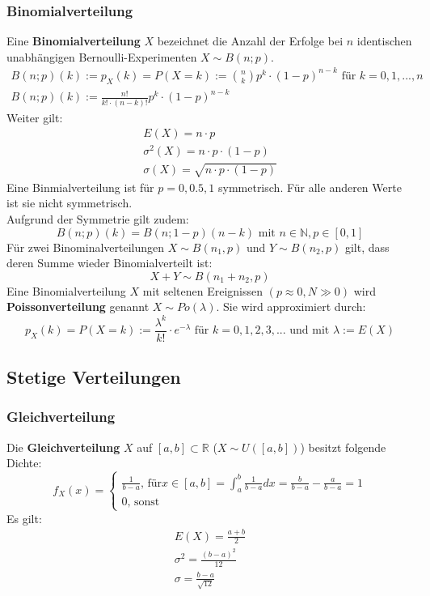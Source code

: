 \documentclass[12pt]{article}
\begin{document}
\subsubsection{Binomialverteilung}
Eine \textbf{Binomialverteilung} $X$ bezeichnet die Anzahl der Erfolge bei $n$ identischen unabhängigen Bernoulli-Experimenten $X \sim B(n;p)$.  
\begin{gather*}
	B(n;p)(k) := p_X(k) = P(X=k):= {n \choose k}p^k\cdot (1-p)^{n-k} \text{ für } k=0,1,...,n \\
	 B(n;p)(k) := \frac{n!}{k!\cdot(n-k)!}p^k\cdot (1-p)^{n-k}
\end{gather*}
Weiter gilt:
\begin{gather*}
	E(X)=n\cdot p\\
	\sigma^2(X)=n\cdot p \cdot (1-p)\\
	\sigma(X)=\sqrt{n\cdot p\cdot (1-p)}
\end{gather*}
Eine Binmialverteilung ist für $p=0,0.5,1$ symmetrisch. Für alle anderen Werte ist sie nicht symmetrisch.\\
Aufgrund der Symmetrie gilt zudem:
\begin{equation*}
	B(n;p)(k) = B(n;1-p)(n-k) \text{ mit } n\in \mathbb{N}, p\in [0,1]
\end{equation*}
Für zwei Binominalverteilungen $X\sim B(n_1,p)$ und $Y\sim B(n_2,p)$ gilt, dass deren Summe wieder Binomialverteilt ist:
\begin{equation*}
	X+Y\sim B(n_1+n_2,p)
\end{equation*}
Eine Binomialverteilung $X$ mit seltenen Ereignissen $(p\approx0, N\gg 0)$ wird \textbf{Poissonverteilung} genannt $X\sim Po(\lambda)$. Sie wird approximiert durch:
\begin{equation*}
	p_X(k)=P(X=k):=\frac{\lambda^k}{k!}\cdot e^{-\lambda} \text{ für } k=0,1,2,3,... \text{ und mit } \lambda:=E(X)
\end{equation*}
\subsection{Stetige Verteilungen}
\subsubsection{Gleichverteilung}
Die \textbf{Gleichverteilung} $X$ auf $[a,b]\subset \mathbb{R}$ ($X\sim U([a,b])$) besitzt folgende Dichte:
\begin{equation*}
	f_X(x)=\begin{cases}
		\frac{1}{b-a} \text{, für} x\in [a,b] = \int_a^b\frac{1}{b-a}dx=\frac{b}{b-a}-\frac{a}{b-a}=1\\
		0\text{, sonst}
	\end{cases}
\end{equation*}
Es gilt:
\begin{gather*}
	E(X)=\frac{a+b}{2}\\
	\sigma^2 =\frac{(b-a)^2}{12}\\
	\sigma = \frac{b-a}{\sqrt{12}}
\end{gather*}
\end{document}
